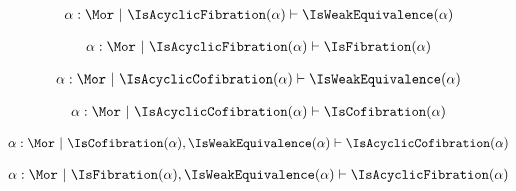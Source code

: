 \begin{sequent}
\begin{align*}
\alpha:\Mor ~|~ \IsAcyclicFibration( \alpha ) \vdash \IsWeakEquivalence( \alpha )
\end{align*}
\end{sequent}

\begin{sequent}
\begin{align*}
\alpha:\Mor ~|~ \IsAcyclicFibration( \alpha ) \vdash \IsFibration( \alpha )
\end{align*}
\end{sequent}

\begin{sequent}
\begin{align*}
\alpha:\Mor ~|~ \IsAcyclicCofibration( \alpha ) \vdash \IsWeakEquivalence( \alpha )
\end{align*}
\end{sequent}

\begin{sequent}
\begin{align*}
\alpha:\Mor ~|~ \IsAcyclicCofibration( \alpha ) \vdash \IsCofibration( \alpha )
\end{align*}
\end{sequent}

\begin{sequent}
\begin{align*}
\alpha:\Mor ~|~ \IsCofibration( \alpha ), \IsWeakEquivalence( \alpha ) \vdash \IsAcyclicCofibration( \alpha )
\end{align*}
\end{sequent}

\begin{sequent}
\begin{align*}
\alpha:\Mor ~|~ \IsFibration( \alpha ), \IsWeakEquivalence( \alpha ) \vdash \IsAcyclicFibration( \alpha )
\end{align*}
\end{sequent}


